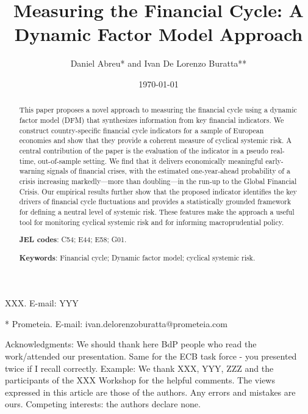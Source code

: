 \documentclass[a4paper, notitlepage,12pt]{article}
\title{\textbf{Measuring the Financial Cycle: A Dynamic Factor Model Approach}}
\author{Daniel Abreu* and  
Ivan De Lorenzo Buratta**}
\date{\today }
\begin{document}
\maketitle
 \begin{abstract}
 \noindent 
 This paper proposes a novel approach to measuring the financial cycle using a dynamic factor model (DFM) that synthesizes information from key financial indicators. We construct country-specific financial cycle indicators for a sample of European economies and show that they provide a coherent measure of cyclical systemic risk. A central contribution of the paper is the evaluation of the indicator in a pseudo real-time, out-of-sample setting. We find that it delivers economically meaningful early-warning signals of financial crises, with the estimated one-year-ahead probability of a crisis increasing markedly—more than doubling—in the run-up to the Global Financial Crisis. Our empirical results further show that the proposed indicator identifies the key drivers of financial cycle fluctuations and provides a statistically grounded framework for defining a neutral level of systemic risk. These features make the approach a useful tool for monitoring cyclical systemic risk and for informing macroprudential policy.


\vspace{0.25cm}

\textbf{JEL codes}: C54; E44; E58; G01.

\textbf{Keywords}: Financial cycle; Dynamic factor model; cyclical systemic risk.
 
 \end{abstract}


\vspace{0.25cm}

\noindent
\begin{footnotesize}


  { \color{blue} 
  \noindent * XXX. E-mail: YYY
  
  \noindent ** Prometeia. E-mail: ivan.delorenzoburatta@prometeia.com 
  
  \noindent Acknowledgments: We should thank here BdP people who read the work/attended our presentation. Same for the ECB task force - you presented twice if I recall correctly. Example:
    We thank XXX, YYY, ZZZ and the participants of the XXX Workshop for the helpful comments. The views expressed in this article are those of the authors. Any errors and mistakes are ours. Competing interests: the authors declare none.}
\end{footnotesize}
\end{document}
